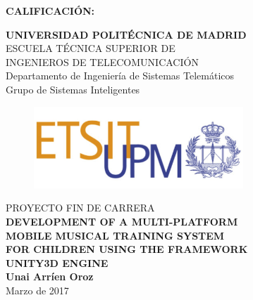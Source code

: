 {\large{\bf CALIFICACIÓN:}}
\pagestyle{empty}
\cleardoublepage
\vspace*{\baselineskip}
\begin{center}
	{\LARGE\rm\textbf{UNIVERSIDAD POLITÉCNICA DE MADRID}\\
	\vspace{1.0cm}
	 ESCUELA TÉCNICA SUPERIOR DE\\ INGENIEROS DE TELECOMUNICACIÓN
	  }  \\

	 {\Large\rm Departamento de Ingeniería de Sistemas Telemáticos\\
	 Grupo de Sistemas Inteligentes  }  \\

\begin{figure}[!htbp]
	\centering
    \includegraphics[width=0.7\textwidth]{img/logo_etsit.jpg}

\end{figure}
	\vspace{1.0cm}
	{{\LARGE\rm PROYECTO FIN DE CARRERA\\
	\vspace{1.0cm}
	 \textbf{DEVELOPMENT OF A MULTI-PLATFORM}\\	 
	 \textbf{MOBILE MUSICAL TRAINING SYSTEM}\\ 
	 \textbf{FOR CHILDREN USING THE FRAMEWORK}\\
	 \vspace{0.5cm}
	 \textbf{UNITY3D ENGINE} }}  \\
	 
	 \vspace{1.0cm}
     \Large\rm\textbf{Unai Arríen Oroz}\\
	 \vspace{1.0cm}
	 Marzo de 2017
\end{center}  

%
